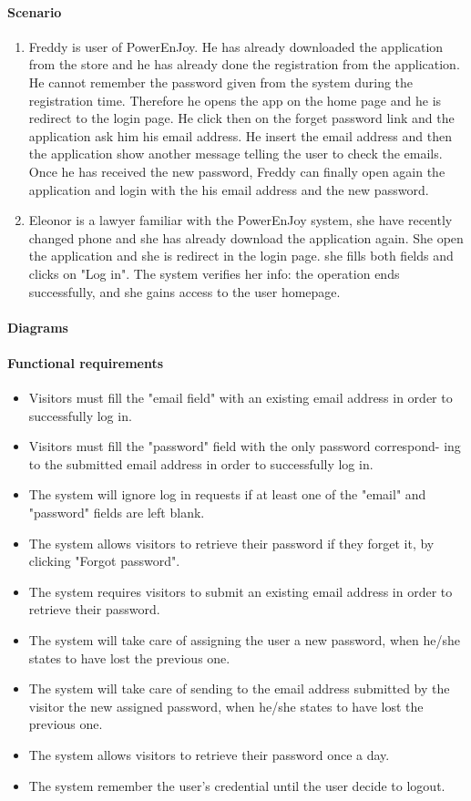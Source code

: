 \paragraph{Scenario}
\begin {enumerate}
\item Freddy is user of PowerEnJoy. He has already downloaded the application from the store and he has already done the registration from the application. He cannot remember the password given from the system during the registration time. Therefore he opens the app on the home page and he is redirect to the login page. He click then on the forget password link and the application ask him his email address. He insert the email address and then the application show another message telling the user to check the emails. Once he has received the new password, Freddy can finally open again the application and login with the his email address and the new password.
\item Eleonor is a lawyer familiar with the PowerEnJoy system, she have recently changed phone and she has already download the application again. She open the application and she is redirect in the login page. she fills both fields and clicks on "Log in". The system verifies her info: the operation ends successfully, and she gains access to the user homepage.
\end{enumerate}
\paragraph{Diagrams}
\paragraph{Functional requirements }
\begin{itemize}
	\item Visitors must fill the "email field" with an existing email address in order to successfully log in.
	\item Visitors must fill the "password" field with the only password correspond- ing to the submitted email address in order to successfully log in.
	\item The system will ignore log in requests if at least one of the "email" and "password" fields are left blank.
	\item The system allows visitors to retrieve their password if they forget it, by clicking "Forgot password".
	\item The system requires visitors to submit an existing email address in order to retrieve their password.
	\item The system will take care of assigning the user a new password, when he/she states to have lost the previous one.
	\item The system will take care of sending to the email address submitted by the visitor the new assigned password, when he/she states to have lost the previous one.
	\item The system allows visitors to retrieve their password once a day.
	\item The system remember the user's credential until the user decide to logout.
\end{itemize}

